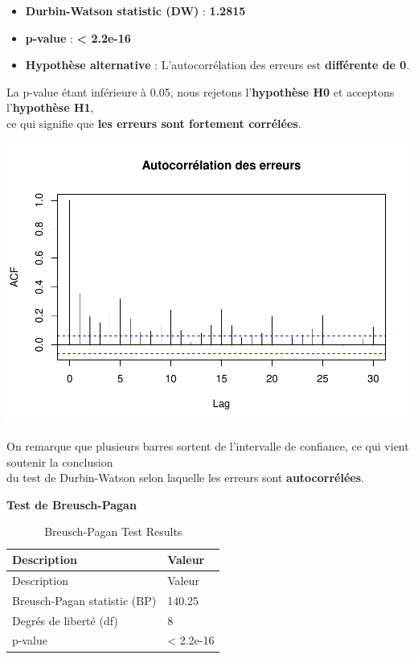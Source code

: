 \documentclass[
  12pt,
]{article}
\providecommand{\tightlist}{%
  \setlength{\itemsep}{0pt}\setlength{\parskip}{0pt}}
\begin{document}
\begin{itemize}
\tightlist
\item
  \textbf{Durbin-Watson statistic (DW)} : \textbf{1.2815}\\
\item
  \textbf{p-value} : \textbf{\textless{} 2.2e-16}\\
\item
  \textbf{Hypothèse alternative} : L'autocorrélation des erreurs est
  \textbf{différente de 0}.
\end{itemize}

La p-value étant inférieure à 0.05, nous rejetons l'\textbf{hypothèse
H0} et acceptons l'\textbf{hypothèse H1},\\
ce qui signifie que \textbf{les erreurs sont fortement corrélées}.

\includegraphics{rmd_final_files/figure-latex/unnamed-chunk-14-1.pdf}

On remarque que plusieurs barres sortent de l'intervalle de confiance,
ce qui vient soutenir la conclusion\\
du test de Durbin-Watson selon laquelle les erreurs sont
\textbf{autocorrélées}.

\textbf{Test de Breusch-Pagan}

\begin{longtable}[]{@{}ll@{}}
\caption{Breusch-Pagan Test Results}\tabularnewline
\toprule\noalign{}
Description & Valeur \\
\midrule\noalign{}
\endfirsthead
\toprule\noalign{}
Description & Valeur \\
\midrule\noalign{}
\endhead
\bottomrule\noalign{}
\endlastfoot
Breusch-Pagan statistic (BP) & 140.25 \\
Degrés de liberté (df) & 8 \\
p-value & \textless{} 2.2e-16 \\
\end{longtable}
\end{document}
